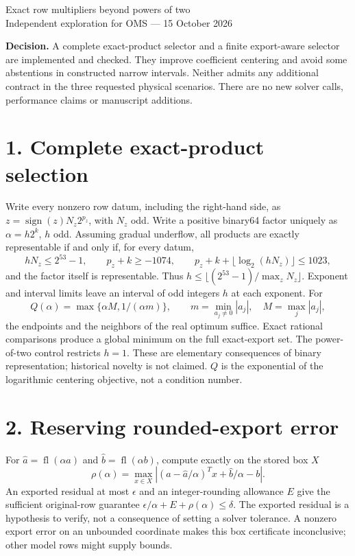 \documentclass[10pt,a4paper]{article}
\begin{document}
\begin{center}\Large Exact row multipliers beyond powers of two\\[3pt]
\normalsize Independent exploration for OMS --- 15 October 2026\end{center}
\textbf{Decision.} A complete exact-product selector and a finite export-aware
selector are implemented and checked. They improve coefficient centering and
avoid some abstentions in constructed narrow intervals. Neither admits any
additional contract in the three requested physical scenarios. There are no
new solver calls, performance claims or manuscript additions.

\section*{1. Complete exact-product selection}
Write every nonzero row datum, including the right-hand side, as
$z=\operatorname{sign}(z)N_z2^{p_z}$, with $N_z$ odd. Write a positive
binary64 factor uniquely as $\alpha=h2^k$, $h$ odd. Assuming gradual underflow,
all products are exactly representable if and only if, for every datum,
\[
 hN_z\le 2^{53}-1,\qquad p_z+k\ge-1074,\qquad
 p_z+k+\lfloor\log_2(hN_z)\rfloor\le1023,
\]
and the factor itself is representable. Thus $h\le
\lfloor(2^{53}-1)/\max_z N_z\rfloor$. Exponent and interval limits leave an
interval of odd integers $h$ at each exponent. For
\[
 Q(\alpha)=\max\{\alpha M,1/(\alpha m)\},\qquad
 m=\min_{a_j\ne0}|a_j|,\quad M=\max_j|a_j|,
\]
the endpoints and the neighbors of the real optimum suffice. Exact rational
comparisons produce a global minimum on the full exact-export set. The
power-of-two control restricts $h=1$. These are elementary consequences of
binary representation; historical novelty is not claimed. $Q$ is the
exponential of the logarithmic centering objective, not a condition number.

\section*{2. Reserving rounded-export error}
For $\widehat a=\operatorname{fl}(\alpha a)$ and
$\widehat b=\operatorname{fl}(\alpha b)$, compute exactly on the stored box $X$
\[
 \rho(\alpha)=\max_{x\in X}
 \left|(a-\widehat a/\alpha)^Tx+\widehat b/\alpha-b\right|.
\]
An exported residual at most $\epsilon$ and an integer-rounding allowance $E$
give the sufficient original-row guarantee
$\epsilon/\alpha+E+\rho(\alpha)\le\delta$.
The exported residual is a hypothesis to verify, not a consequence of setting
a solver tolerance. A nonzero export error on an unbounded coordinate makes
this box certificate inconclusive; other model rows might supply bounds.
\end{document}
